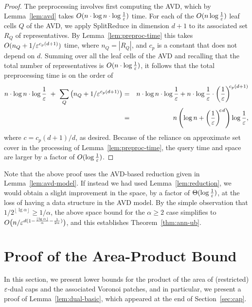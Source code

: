 \documentclass[11pt]{article}   \usepackage[letterpaper,hmargin=2.1cm,vmargin=3cm]{geometry}
\newcommand{\floor}[1]{\left\lfloor #1\right\rfloor}
\newcommand{\inv}[1]{\frac{1}{#1}}
\newcommand{\alg}{\textrm{SplitReduce}}
\renewcommand{\P}{\kern+1pt}    \newcommand{\N}{\kern-2pt}      \newcommand{\NN}{\kern-4pt}     \newcommand{\polar}[1]{\mathrm{polar}(#1)}            \newcommand{\polarX}[2]{\mathrm{polar}_{#1}(#2)}
\begin{document}
\begin{proof}
The preprocessing involves first computing the AVD, which by Lemma~\ref{lem:avd} takes $O(n \cdot \log n \cdot \log \inv{\eps})$ time. For each of the $O(n \log \inv{\eps})$ leaf cells $Q$ of the AVD, we apply {\alg} in dimension $d+1$ to its associated set $R_Q$ of representatives. By Lemma~\ref{lem:preproc-time} this takes $O(n_Q + 1/\varepsilon^{c_p(d+1)})$ time, where $n_Q = |R_Q|$, and $c_p$ is a constant that does not depend on $d$. Summing over all the leaf cells of the AVD and recalling that the total number of representatives is $O(n \cdot \log \inv{\eps})$, it follows that the total preprocessing time is on the order of
\begin{eqnarray*}
  n \cdot \log n \cdot \log \inv{\eps} ~+~ \sum_Q \big(n_Q + 1/\eps^{c_p(d+1)}\big)
	& = & n \cdot \log n \cdot \log \inv{\eps} + n \cdot \log \inv{\eps} \cdot \left(\inv{\eps}\right)^{\N c_p(d+1)} \\
	& = & n \left(\log n + \left( \inv{\eps}\right)^{\N c \P d} \right) \log \inv{\eps},
\end{eqnarray*}
where $c = c_p(d+1)/d$, as desired. Because of the reliance on approximate set cover in the processing of Lemma~\ref{lem:preproc-time}, the query time and space are larger by a factor of $O(\log \inv{\eps})$.
\end{proof}


Note that the above proof uses the AVD-based reduction given in Lemma~\ref{lem:avd-model}. If instead we had used Lemma~\ref{lem:reduction}, we would obtain a slight improvement in the space, by a factor of $\Theta(\log \inv{\eps})$, at the loss of having a data structure in the AVD model. By the simple observation that $1/2^{\floor{\lg \alpha}} \ge 1/\alpha$, the above space bound for the $\alpha \ge 2$ case simplifies to $O\big( n/\eps^{d (1 - \frac{\floor{\lg\alpha}}{\alpha} - \inv{2 \alpha})}\big)$, and this establishes Theorem~\ref{thm:ann-ub}.

\section{Proof of the Area-Product Bound} \label{sec:proof}


In this section, we present lower bounds for the product of the area of (restricted) $\varepsilon$-dual caps and the associated Voronoi patches, and in particular, we present a proof of Lemma~\ref{lem:dual-basic}, which appeared at the end of Section~\ref{sec:cap}.
\end{document}
